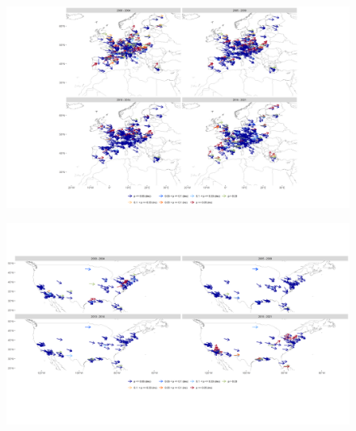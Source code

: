 \documentclass[journal abbreviation, manuscript]{copernicus}
\begin{document}
\begin{figure}[htbp]
\includegraphics[width=12cm]{plots/arrow_maps/no2/11/EU_map_spc_no2_tau_0.5_seg_11_14.png}
\caption{}
\label{fig:arrow_eu_no2}
\end{figure}

\begin{figure}[htbp]
\includegraphics[width=12cm]{plots/arrow_maps/no2/11/US_map_spc_no2_tau_0.5_seg_11_14.png}
\caption{}
\label{fig:arrow_us_no2}
\end{figure}
\end{document}
